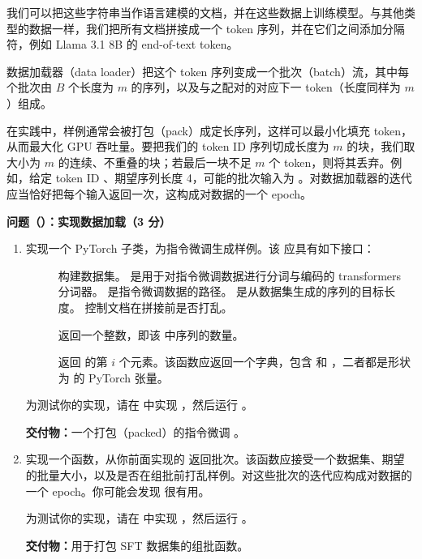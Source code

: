 我们可以把这些字符串当作语言建模的文档，并在这些数据上训练模型。与其他类型的数据一样，我们把所有文档拼接成一个 token 序列，并在它们之间添加分隔符，例如 Llama 3.1 8B 的 end-of-text token。

数据加载器（data loader）把这个 token 序列变成一个批次（batch）流，其中每个批次由 $B$ 个长度为 $m$ 的序列，以及与之配对的对应下一 token（长度同样为 $m$）组成。

在实践中，样例通常会被打包（pack）成定长序列，这样可以最小化填充 token，从而最大化 GPU 吞吐量。要把我们的 token ID 序列切成长度为 $m$ 的块，我们取大小为 $m$ 的连续、不重叠的块；若最后一块不足 $m$ 个 token，则将其丢弃。例如，给定 token ID \tm{[0, 1, 2, ..., 9, 10]}、期望序列长度 4，可能的批次输入为 \tm{[[0, 1, 2, 3], [4, 5, 6, 7]]}。对数据加载器的迭代应当恰好把每个输入返回一次，这构成对数据的一个 epoch。

\medskip
\noindent\textbf{问题（）：实现数据加载（3 分）}
\medskip

\begin{enumerate}[label=(\alph*)]
  \item 实现一个 PyTorch  子类，为指令微调生成样例。该  应具有如下接口：
\begin{description}
  \item[] 构建数据集。 是用于对指令微调数据进行分词与编码的 transformers 分词器。 是指令微调数据的路径。 是从数据集生成的序列的目标长度。 控制文档在拼接前是否打乱。
  \item[] 返回一个整数，即该  中序列的数量。
  \item[] 返回  的第 $i$ 个元素。该函数应返回一个字典，包含  和 ，二者都是形状为  的 PyTorch 张量。
\end{description}

  为测试你的实现，请在  中实现 ，然后运行 。

  \textbf{交付物：}一个打包（packed）的指令微调 。
  \item 实现一个函数，从你前面实现的  返回批次。该函数应接受一个数据集、期望的批量大小，以及是否在组批前打乱样例。对这些批次的迭代应构成对数据的一个 epoch。你可能会发现  很有用。

  为测试你的实现，请在  中实现 ，然后运行 。

  \textbf{交付物：}用于打包 SFT 数据集的组批函数。
\end{enumerate}

